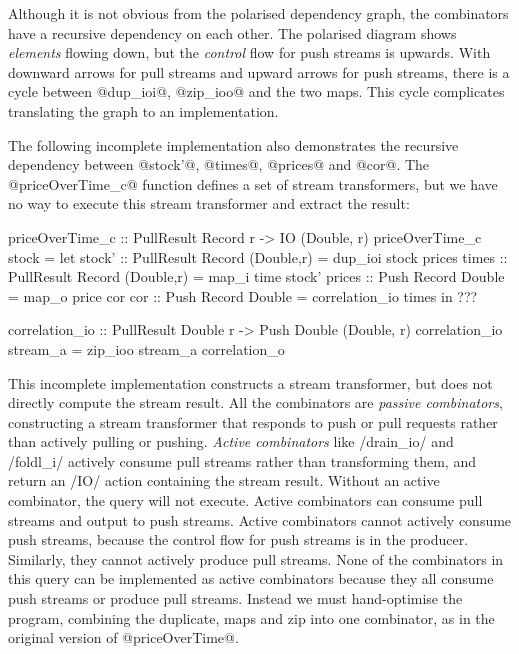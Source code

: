 Although it is not obvious from the polarised dependency graph, the combinators have a recursive dependency on each other.
The polarised diagram shows \emph{elements} flowing down, but the \emph{control} flow for push streams is upwards.
With downward arrows for pull streams and upward arrows for push streams, there is a cycle between @dup_ioi@, @zip_ioo@ and the two maps.
This cycle complicates translating the graph to an implementation.

The following incomplete implementation also demonstrates the recursive dependency between @stock'@, @times@, @prices@ and @cor@.
The @priceOverTime_c@ function defines a set of stream transformers, but we have no way to execute this stream transformer and extract the result:

\begin{haskell}
priceOverTime_c :: PullResult Record r -> IO (Double, r)
priceOverTime_c stock =
  let stock' :: PullResult Record (Double,r)
              = dup_ioi stock prices
      times  :: PullResult Record (Double,r)
              = map_i time stock'
      prices :: Push Record Double
              = map_o price cor
      cor    :: Push Record Double
              = correlation_io times
  in ???

correlation_io :: PullResult Double r -> Push Double (Double, r)
correlation_io stream_a = zip_ioo stream_a correlation_o
\end{haskell}

This incomplete implementation constructs a stream transformer, but does not directly compute the stream result.
All the combinators are \emph{passive combinators}, constructing a stream transformer that responds to push or pull requests rather than actively pulling or pushing.
\emph{Active combinators} like \Hs/drain_io/ and \Hs/foldl_i/ actively consume pull streams rather than transforming them, and return an \Hs/IO/ action containing the stream result.
Without an active combinator, the query will not execute.
Active combinators can consume pull streams and output to push streams.
Active combinators cannot actively consume push streams, because the control flow for push streams is in the producer.
Similarly, they cannot actively produce pull streams.
None of the combinators in this query can be implemented as active combinators because they all consume push streams or produce pull streams.
Instead we must hand-optimise the program, combining the duplicate, maps and zip into one combinator, as in the original version of @priceOverTime@.


